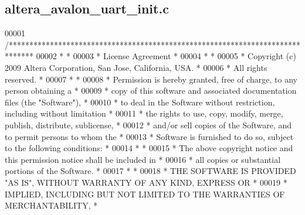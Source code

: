 \subsection{altera\+\_\+avalon\+\_\+uart\+\_\+init.\+c}
\label{altera__avalon__uart__init_8c_source}

\begin{DoxyCode}
00001 \textcolor{comment}{/******************************************************************************}
00002 \textcolor{comment}{*                                                                             *}
00003 \textcolor{comment}{* License Agreement                                                           *}
00004 \textcolor{comment}{*                                                                             *}
00005 \textcolor{comment}{* Copyright (c) 2009 Altera Corporation, San Jose, California, USA.           *}
00006 \textcolor{comment}{* All rights reserved.                                                        *}
00007 \textcolor{comment}{*                                                                             *}
00008 \textcolor{comment}{* Permission is hereby granted, free of charge, to any person obtaining a     *}
00009 \textcolor{comment}{* copy of this software and associated documentation files (the "Software"),  *}
00010 \textcolor{comment}{* to deal in the Software without restriction, including without limitation   *}
00011 \textcolor{comment}{* the rights to use, copy, modify, merge, publish, distribute, sublicense,    *}
00012 \textcolor{comment}{* and/or sell copies of the Software, and to permit persons to whom the       *}
00013 \textcolor{comment}{* Software is furnished to do so, subject to the following conditions:        *}
00014 \textcolor{comment}{*                                                                             *}
00015 \textcolor{comment}{* The above copyright notice and this permission notice shall be included in  *}
00016 \textcolor{comment}{* all copies or substantial portions of the Software.                         *}
00017 \textcolor{comment}{*                                                                             *}
00018 \textcolor{comment}{* THE SOFTWARE IS PROVIDED "AS IS", WITHOUT WARRANTY OF ANY KIND, EXPRESS OR  *}
00019 \textcolor{comment}{* IMPLIED, INCLUDING BUT NOT LIMITED TO THE WARRANTIES OF MERCHANTABILITY,    *}

\end{DoxyCode}
